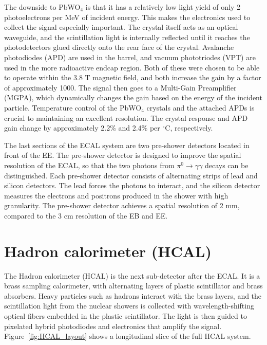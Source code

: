The downside to PbWO$_4$ is that it has a relatively low light yield of only 2 photoelectrons per MeV of incident energy. This makes the electronics used to collect the signal especially important. The crystal itself acts as an optical waveguide, and the scintillation light is internally reflected until it reaches the photodetectors glued directly onto the rear face of the crystal. Avalanche photodiodes (APD) are used in the barrel, and vacuum phototriodes (VPT) are used in the more radioactive endcap region. Both of these were chosen to be able to operate within the 3.8 T magnetic field, and both increase the gain by a factor of approximately 1000.
The signal then goes to a Multi-Gain Preamplifier (MGPA), which dynamically changes the gain based on the energy of the incident particle. 
Temperature control of the PbWO$_4$ crystals and the attached APDs is crucial to maintaining an excellent resolution. The crystal response and APD gain change by approximately 2.2\% and 2.4\% per $^\circ$C, respectively. 

The last sections of the ECAL system are two pre-shower detectors located in front of the EE. The pre-shower detector is designed to improve the spatial resolution of the ECAL, so that the two photons from $\pi^0\rightarrow\gamma\gamma$ decays can be distinguished. Each pre-shower detector consists of alternating strips of lead and silicon detectors. The lead forces the photons to interact, and the silicon detector measures the electrons and positrons produced in the shower with high granularity. The pre-shower detector achieves a spatial resolution of 2 mm, compared to the 3 cm resolution of the EB and EE. 



\section{Hadron calorimeter (HCAL)}
\label{sec:HCAL}
The Hadron calorimeter (HCAL) is the next sub-detector after the ECAL. It is a brass sampling calorimeter, with alternating layers of plastic scintillator and brass absorbers. 
Heavy particles such as hadrons interact with the brass layers, and the scintillation light from the nuclear showers is collected with wavelength-shifting optical fibers embedded in the plastic scintillator. The light is then guided to pixelated hybrid photodiodes and electronics that amplify the signal. Figure~\ref{fig:HCAL_layout} shows a longitudinal slice of the full HCAL system. 

